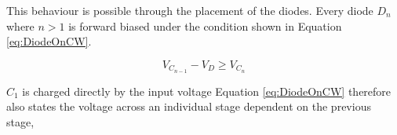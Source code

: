 This behaviour is possible through the placement of the diodes.
Every diode $D_n$ where $n > 1$ is forward biased under the condition shown in Equation \ref{eq:DiodeOnCW}.

\begin{equation}
	V_{C_{n-1}}-V_D \geq V_{C_n}
	\label{eq:DiodeOnCW}
\end{equation}

$C_1$ is charged directly by the input voltage
Equation \ref{eq:DiodeOnCW} therefore also states the voltage across an individual stage dependent on the previous stage,
